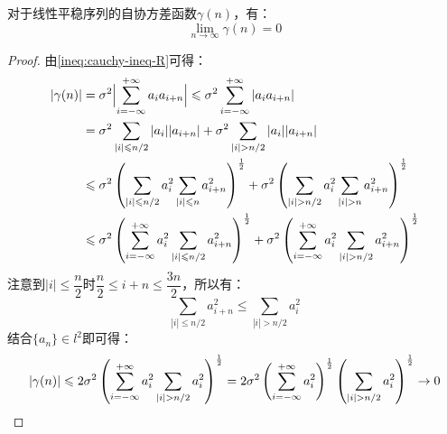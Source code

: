 \begin{theorem}
	对于线性平稳序列的自协方差函数$\gamma(n)$，有：
	\begin{equation*}
		\lim_{n\to\infty}\gamma(n)=0
	\end{equation*}
\end{theorem}
\begin{proof}
	由\cref{ineq:cauchy-ineq-R}可得：
	\begin{align*}
		|\gamma(n)|
		&=\sigma^2\Bigl|\sum_{i=-\infty}^{+\infty}a_ia_{i+n}\Bigr| \leqslant\sigma^2\sum_{i=-\infty}^{+\infty}|a_ia_{i+n}| \\
		&=\sigma^2\sum_{|i|\leqslant n/2}|a_i||a_{i+n}|+\sigma^2\sum_{|i|> n/2}|a_i||a_{i+n}| \\
		&\leqslant\sigma^2\left(\sum_{|i|\leqslant n/2}a_i^2\sum_{|i|\leqslant n}a_{i+n}^2\right)^\frac{1}{2}+\sigma^2\left(\sum_{|i|>n/2}a_i^2\sum_{|i|>n}a_{i+n}^2\right)^\frac{1}{2} \\
		&\leqslant\sigma^2\left(\sum_{i=-\infty}^{+\infty}a_i^2\sum_{|i|\leqslant n/2}a_{i+n}^2\right)^\frac{1}{2}+\sigma^2\left(\sum_{i=-\infty}^{+\infty}a_i^2\sum_{|i|>n/2}a_{i+n}^2\right)^\frac{1}{2}
	\end{align*}
	注意到$|i|\leqslant\dfrac{n}{2}$时$\dfrac{n}{2}\leqslant i+n\leqslant\dfrac{3n}{2}$，所以有：
	\begin{equation*}
		\sum_{|i|\leqslant n/2}a_{i+n}^2\leqslant\sum_{|i|>n/2}a_{i}^2
	\end{equation*}
	结合$\{a_n\}\in l^2$即可得：
	\begin{equation*}
		|\gamma(n)|\leqslant2\sigma^2\left(\sum_{i=-\infty}^{+\infty}a_i^2\sum_{|i|>n/2}a_{i}^2\right)^\frac{1}{2}=2\sigma^2\left(\sum_{i=-\infty}^{+\infty}a_i^2\right)^{\frac{1}{2}}\left(\sum_{|i|>n/2}^{}a_{i}^2\right)^{\frac{1}{2}}\to0\qedhere
	\end{equation*}
\end{proof}

